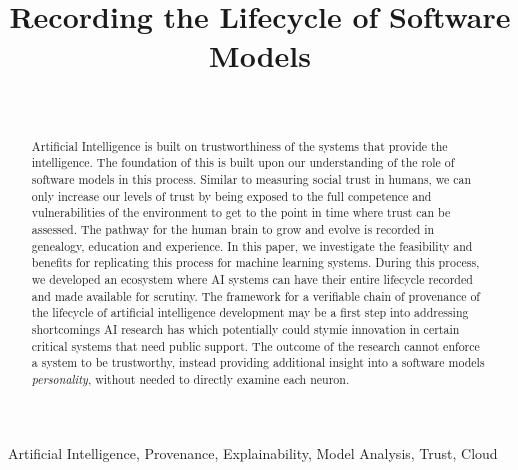 \documentclass[twocolumn,twoside]{IEEEtran}
\begin{document}

\lstset{style=mystyle}



\title{
Recording the Lifecycle of Software Models
}

\author{\\

}

\maketitle

\begin{abstract}
Artificial Intelligence is built on trustworthiness of the systems that provide the intelligence. The foundation of this is built upon our understanding of the role of software models in this process. Similar to measuring social trust in humans, we can only increase our levels of trust by being exposed to the full competence and vulnerabilities of the environment to get to the point in time where trust can be assessed. The pathway for the human brain to grow and evolve is recorded in genealogy, education and experience. In this paper, we investigate the feasibility and benefits for replicating this process for machine learning systems. During this process, we developed an ecosystem where AI systems can have their entire lifecycle recorded and made available for scrutiny. The framework for a verifiable chain of provenance of the lifecycle of artificial intelligence development may be a first step into addressing shortcomings AI research has which potentially could stymie innovation in certain critical systems that need public support. The outcome of the research cannot enforce a system to be trustworthy, instead providing additional insight into a software models \textit{personality}, without needed to directly examine each neuron. 
\end{abstract}

\begin{IEEEkeywords}
Artificial Intelligence, Provenance, Explainability, Model Analysis, Trust, Cloud\end{IEEEkeywords}













\end{document}
